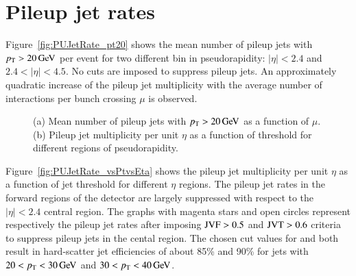 \section{Pileup jet rates}
\label{sec:pileupjetrates}
Figure~\ref{fig:PUJetRate_pt20} shows the mean number of pileup jets with $p_{\mathrm{T}} > 20\,\text{Ge\hspace{-.08em}V}$ per event  
for two different bin in pseudorapidity: $|\eta|<2.4$ and $2.4<|\eta|<4.5$. 
No cuts are imposed to suppress pileup jets. An approximately quadratic increase of the pileup jet multiplicity with the average
number of interactions per bunch crossing $\mu$ is observed. 
\label{sec:Appendix_PUjetRates}
\begin{figure}[!htbp]
  \centering
  \caption{(a) Mean number of pileup jets with $p_{\mathrm{T}}>20\,\text{Ge\hspace{-.08em}V}$ as a function of $\mu$. (b) Pileup jet multiplicity per unit $\eta$ as a function of 
  \pT threshold for different regions of pseudorapidity.
  }
\label{fig:PUJetRates}
\end{figure}
Figure~\ref{fig:PUJetRate_vsPtvsEta} shows the pileup jet multiplicity per unit $\eta$ as a function of jet \pT threshold for different $\eta$ regions. 
The pileup jet rates in the forward regions of the detector are largely suppressed with respect to the $|\eta|<2.4$ central region. 
The graphs with magenta stars and open circles represent respectively the pileup jet rates after imposing ${\rm JVF} > 0.5$ and ${\rm JVT} > 0.6$ criteria
to suppress pileup jets in the cental region. The chosen cut values for \JVF and \JVT both result in hard-scatter jet efficiencies of 
about 85\% and 90\% for jets with $20<p_{\mathrm{T}}<30\,\text{Ge\hspace{-.08em}V}$ and $30<p_{\mathrm{T}} < 40\,\text{Ge\hspace{-.08em}V}$. 
